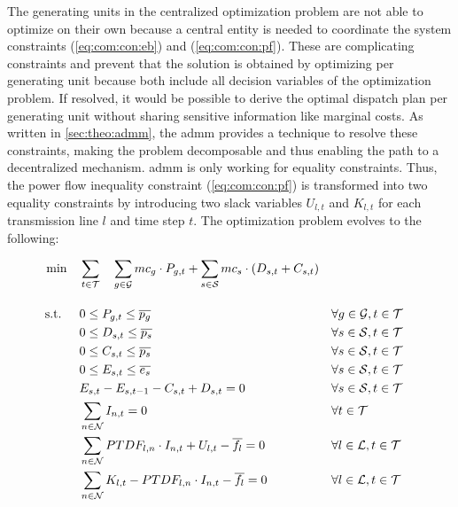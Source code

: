 The generating units in the centralized optimization problem are not able to optimize on their own because a central entity is needed to coordinate the system constraints (\ref{eq:com:con:eb}) and (\ref{eq:com:con:pf}). These are complicating constraints and prevent that the solution is obtained by optimizing per generating unit because both include all decision variables of the optimization problem. If resolved, it would be possible to derive the optimal dispatch plan per generating unit without sharing sensitive information like marginal costs. As written in \ref{sec:theo:admm}, the \gls{admm} provides a technique to resolve these constraints, making the problem decomposable and thus enabling the path to a decentralized mechanism. \gls{admm} is only working for equality constraints. Thus, the power flow inequality constraint (\ref{eq:com:con:pf}) is transformed into two equality constraints by introducing two slack variables $U_{l,t}$ and $K_{l,t}$ for each transmission line $l$ and time step $t$. The optimization problem evolves to the following:

\begin{subequations}
	\begin{align}
		 \min \quad & \sum_{t\in\mathcal{T}} \quad \sum_{g\in\mathcal{G}}mc_g \cdot P_{g,t} + \sum_{s\in\mathcal{S}}mc_s \cdot (D_{s,t}+C_{s,t}) \label{eq:dom:relaxed-constraints}\\[10pt]
		 \text{s.t. } \quad & 0 \leq P_{g,t} \leq \overline{p_g} && \forall g \in \mathcal{G}, t \in \mathcal{T}\\
		 & 0 \leq D_{s,t} \leq \overline{p_s} && \forall s \in \mathcal{S}, t \in \mathcal{T} \\
		 & 0 \leq C_{s,t} \leq \overline{p_s} && \forall s \in \mathcal{S}, t \in \mathcal{T} \\
		 & 0 \leq E_{s,t} \leq \overline{e_s} && \forall s \in \mathcal{S}, t \in \mathcal{T} \\
		 & E_{s,t} - E_{s,t-1} - C_{s,t} + D_{s,t} = 0 && \forall s \in \mathcal{S}, t \in \mathcal{T}\\
		 & \sum_{n \in \mathcal{N}} I_{n,t} = 0 && \forall t \in \mathcal{T} \\
		 & \sum_{n \in \mathcal{N}} PTDF_{l,n} \cdot I_{n,t} + U_{l,t} - \overline{f_l} = 0 && \forall l \in \mathcal{L}, t \in \mathcal{T} \label{eq:dom:con:pf-upper} \\
		 & \sum_{n \in \mathcal{N}} K_{l,t} - PTDF_{l,n} \cdot I_{n,t} - \overline{f_l} = 0 && \forall l \in \mathcal{L}, t \in \mathcal{T} \label{eq:dom:con:pf-lower}
	\end{align}
\end{subequations}

